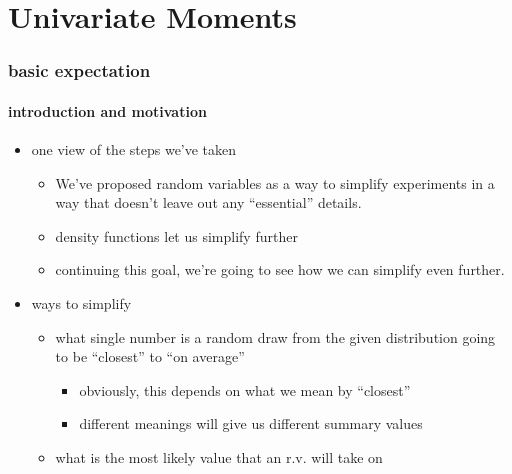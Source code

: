 
\part*{Univariate Moments}%

\section{basic expectation}

\subsection{introduction and motivation}

\begin{itemize}
\item one view of the steps we've taken
\begin{itemize}
\item We've proposed random variables as a way to simplify experiments
         in a way that doesn't leave out any ``essential'' details.
\item density functions let us simplify further
\item continuing this goal, we're going to see how we can simplify even further.
\end{itemize}
\item ways to simplify
\begin{itemize}
\item what single number is a random draw from the given distribution
         going to be ``closest'' to ``on average''
\begin{itemize}
\item obviously, this depends on what we mean by ``closest''
\item different meanings will give us different summary values
\end{itemize}
\item what is the most likely value that an r.v. will take on
\end{itemize}
\end{itemize}

